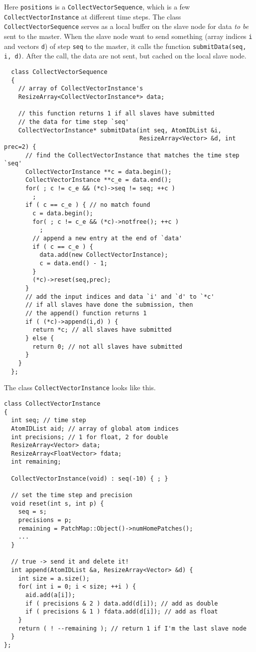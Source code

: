 \documentclass{article}
\begin{document}
Here \texttt{positions} is a \texttt{CollectVectorSequence},
which is a few \texttt{CollectVectorInstance}
at different time steps.
%
The class \texttt{CollectVectorSequence} serves
as a local buffer on the slave node for data
\emph{to be} sent to the master.
%
When the slave node want to send something
(array indices \texttt{i} and vectors \texttt{d})
of step \texttt{seq} to the master,
it calls the function \texttt{submitData(seq, i, d)}.
%
After the call, the data are not sent,
but cached on the local slave node.


\begin{lstlisting}
  class CollectVectorSequence
  {
    // array of CollectVectorInstance's
    ResizeArray<CollectVectorInstance*> data;

    // this function returns 1 if all slaves have submitted
    // the data for time step `seq'
    CollectVectorInstance* submitData(int seq, AtomIDList &i,
                                      ResizeArray<Vector> &d, int prec=2) {
      // find the CollectVectorInstance that matches the time step `seq'
      CollectVectorInstance **c = data.begin();
      CollectVectorInstance **c_e = data.end();
      for( ; c != c_e && (*c)->seq != seq; ++c )
        ;
      if ( c == c_e ) { // no match found
        c = data.begin();
        for( ; c != c_e && (*c)->notfree(); ++c )
          ;
        // append a new entry at the end of `data'
        if ( c == c_e ) {
          data.add(new CollectVectorInstance);
          c = data.end() - 1;
        }
        (*c)->reset(seq,prec);
      }
      // add the input indices and data `i' and `d' to `*c'
      // if all slaves have done the submission, then
      // the append() function returns 1
      if ( (*c)->append(i,d) ) {
        return *c; // all slaves have submitted
      } else {
        return 0; // not all slaves have submitted
      }
    }
  };
\end{lstlisting}

The class \texttt{CollectVectorInstance} looks like this.

\begin{lstlisting}
class CollectVectorInstance
{
  int seq; // time step
  AtomIDList aid; // array of global atom indices
  int precisions; // 1 for float, 2 for double
  ResizeArray<Vector> data;
  ResizeArray<FloatVector> fdata;
  int remaining;

  CollectVectorInstance(void) : seq(-10) { ; }

  // set the time step and precision
  void reset(int s, int p) {
    seq = s;
    precisions = p;
    remaining = PatchMap::Object()->numHomePatches();
    ...
  }

  // true -> send it and delete it!
  int append(AtomIDList &a, ResizeArray<Vector> &d) {
    int size = a.size();
    for( int i = 0; i < size; ++i ) {
      aid.add(a[i]);
      if ( precisions & 2 ) data.add(d[i]); // add as double
      if ( precisions & 1 ) fdata.add(d[i]); // add as float
    }
    return ( ! --remaining ); // return 1 if I'm the last slave node
  }
};
\end{lstlisting}
\end{document}
